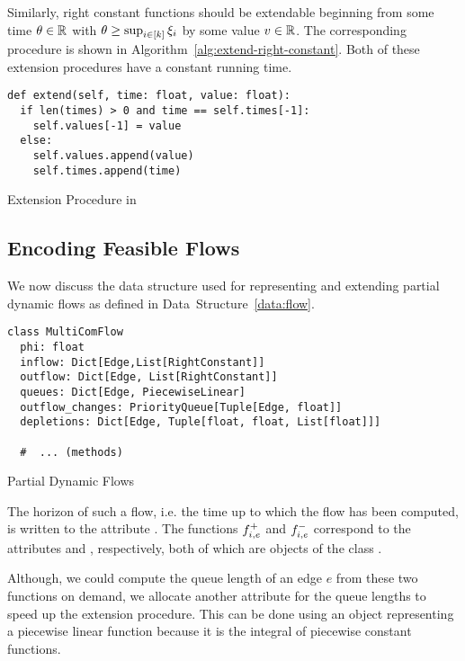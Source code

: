 Similarly, right constant functions should be extendable beginning from some time $\theta \in\mathbb{R}$ with $\theta \geq \sup_{i\in[k]} \xi_i$ by some value $v\in\mathbb{R}$.
The corresponding procedure is shown in Algorithm~\ref{alg:extend-right-constant}.
Both of these extension procedures have a constant running time.

\begin{algorithm}
  \begin{verbatim}
def extend(self, time: float, value: float):
  if len(times) > 0 and time == self.times[-1]:
    self.values[-1] = value
  else:
    self.values.append(value)
    self.times.append(time)
  \end{verbatim}
  \caption{Extension Procedure in }
  \label{alg:extend-right-constant}
\end{algorithm}

\subsection{Encoding Feasible Flows}

We now discuss the data structure used for representing and extending partial dynamic flows as defined in Data~Structure~\ref{data:flow}.

\begin{classdef}
    \begin{verbatim}
class MultiComFlow
  phi: float
  inflow: Dict[Edge,List[RightConstant]]
  outflow: Dict[Edge, List[RightConstant]]
  queues: Dict[Edge, PiecewiseLinear]
  outflow_changes: PriorityQueue[Tuple[Edge, float]]
  depletions: Dict[Edge, Tuple[float, float, List[float]]]

  #  ... (methods)
\end{verbatim}
    \caption{Partial Dynamic Flows}
    \label{data:flow}
\end{classdef}

The horizon of such a flow, i.e. the time up to which the flow has been computed, is written to the attribute .
The functions ${f}^+_{i,e}$ and ${f}^-_{i,e}$ correspond to the attributes  and , respectively, both of which are objects of the class .

Although, we could compute the queue length of an edge $e$ from these two functions on demand, we allocate 
another attribute  for the queue lengths to speed up the extension procedure.
This can be done using an object representing a piecewise linear function because it is the integral of piecewise constant functions.

